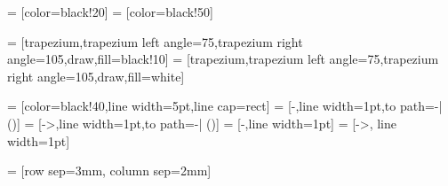  = [color=black!20]
 = [color=black!50]

\newcommand{\dataRightAngle}{105}
\newcommand{\dataLeftAngle}{75}

 = [trapezium,trapezium left angle=\dataLeftAngle,trapezium right angle=\dataRightAngle,draw,fill=black!10]
 = [trapezium,trapezium left angle=\dataLeftAngle,trapezium right angle=\dataRightAngle,draw,fill=white]

 = [color=black!40,line width=5pt,line cap=rect]
 = [-,line width=1pt,to path={-| (\tikztotarget)}]
 = [->,line width=1pt,to path={-| (\tikztotarget)}]
 = [-,line width=1pt]
 = [->, line width=1pt]

 = [row sep=3mm, column sep=2mm]



\newcommand{\MultilineComponent}[2]
{
	\begin{minipage}{#1}
	\begin{center}
		#2
	\end{center}
	\end{minipage}
}

\newcommand{\TwolineComponent}[3]
{
	\begin{minipage}{#1}
	\begin{center}
		#2 \linebreak #3
	\end{center}
	\end{minipage}
}

\newcommand{\ThreelineComponent}[4]
{
	\begin{minipage}{#1}
	\begin{center}
		#2 \linebreak #3 \linebreak #4
	\end{center}
	\end{minipage}
}

\newcommand{\MultiColumnComponent}[5]
{
	\begin{minipage}{#1}
	\begin{center}
	#2 \linebreak #3
	\end{center}
	\begin{minipage}{0.49\textwidth}
	\begin{center}
	#4
	\end{center}
	\end{minipage}
	\begin{minipage}{0.49\textwidth}
	\begin{center}
	#5
	\end{center}
	\end{minipage}
	\end{minipage}
}

\def\arraystretch{1.3}
